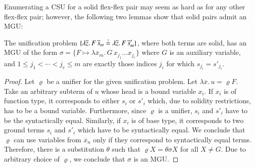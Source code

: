 Enumerating a CSU for a solid flex-flex pair may seem as hard as 
for any other flex-flex pair; however,
the following two lemmas show that solid pairs admit an MGU:

\begin{lemma}
    \label{unif:lemma:solid-var-same-mgu}
    The unification problem 
    $\{\lambda \overline{z}.\, F\,\overline{s}_m \unif   \lambda \overline{z}.\, F\,\overline{s}'_{m}\}$, where both terms are
    solid, has an MGU of the form $\sigma=\{F \mapsto \lambda \overline{x}_m.\,
    G \, x_{j_1} \ldots x_{j_r}\}$ where $G$ is an auxiliary variable, and $1 \leq
    j_1 < \cdots < j_r \leq m$ are exactly those indices $j_i$ for which
    $s_{j_i} = s'_{j_i}$.
\end{lemma}
\begin{proof}
    Let $\varrho$ be a unifier for the given unification problem.
    Let $\lambda \overline{x}.\, u = \varrho F$. Take an arbitrary subterm of $u$ whose head is a bound
    variable $x_i$. If $x_i$ is of function type, it corresponds to either $s_i$
    or $s'_i$ which, due to solidity restrictions, has to be a bound variable.
    Furthermore, since $\varrho$ is a unifier, $s_i$ and $s'_i$ have to be the
    syntactically equal. Similarly, if $x_i$ is of base type, it corresponds
    to two ground terms $s_i$ and $s'_i$ which have to be syntactically equal.
    We conclude that $\varrho$ can use variables from $\overline{x}_n$ only
    if they correspond to syntactically equal terms. Therefore, 
    there is a substitution $\theta$ such that $\varrho X = \theta\sigma X$ for all $X \not = G$. 
    Due to arbitrary choice of $\varrho$, we conclude that $\sigma$ is an MGU.
\end{proof}


